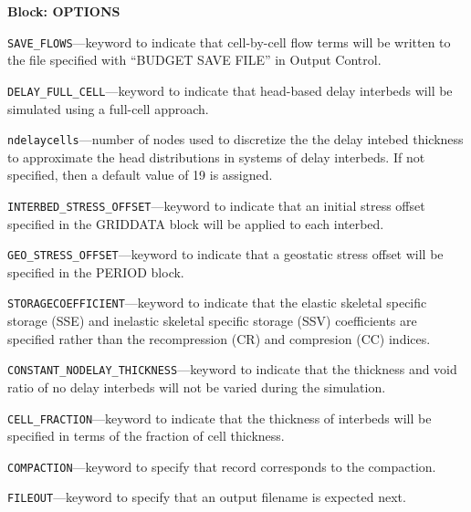 
\item \textbf{Block: OPTIONS}

\begin{description}
\item \texttt{SAVE\_FLOWS}---keyword to indicate that cell-by-cell flow terms will be written to the file specified with ``BUDGET SAVE FILE'' in Output Control.

\item \texttt{DELAY\_FULL\_CELL}---keyword to indicate that head-based delay interbeds will be simulated using a full-cell approach.

\item \texttt{ndelaycells}---number of nodes used to discretize the the delay intebed thickness to approximate the head distributions in systems of delay interbeds. If not specified, then a default value of 19 is assigned.

\item \texttt{INTERBED\_STRESS\_OFFSET}---keyword to indicate that an initial stress offset specified in the GRIDDATA block will be applied to each interbed.

\item \texttt{GEO\_STRESS\_OFFSET}---keyword to indicate that a geostatic stress offset will be specified in the PERIOD block.

\item \texttt{STORAGECOEFFICIENT}---keyword to indicate that the elastic skeletal specific storage (SSE) and inelastic skeletal specific storage (SSV) coefficients are specified rather than the recompression (CR) and compresion (CC) indices.

\item \texttt{CONSTANT\_NODELAY\_THICKNESS}---keyword to indicate that the thickness and void ratio of no delay interbeds will not be varied during the simulation.

\item \texttt{CELL\_FRACTION}---keyword to indicate that the thickness of interbeds will be specified in terms of the fraction of cell thickness.

\item \texttt{COMPACTION}---keyword to specify that record corresponds to the compaction.

\item \texttt{FILEOUT}---keyword to specify that an output filename is expected next.


\end{description}
